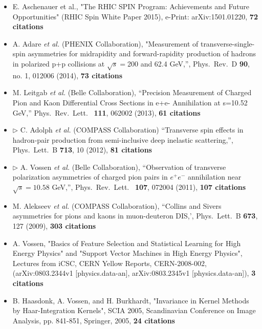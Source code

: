 \documentclass[11pt,letterpaper,sans]{moderncv} %
\begin{document}
\begin{itemize}
\item E. Aschenauer et al., "The RHIC SPIN Program: Achievements and Future Opportunities" (RHIC Spin White Paper 2015), e-Print: arXiv:1501.01220, \textbf{72 citations}
\item A. Adare \textit{ et al.}  (PHENIX Collaboration), "Measurement of transverse-single-spin asymmetries for midrapidity and forward-rapidity production of hadrons in polarized p+p collisions at $\sqrt{s}=$200 and 62.4 GeV,'', Phys.\ Rev.\ D \textbf{ 90}, no. 1, 012006 (2014), \textbf{73 citations}
    \item M. Leitgab \textit{  et al.} (Belle Collaboration), ``Precision Measurement of Charged Pion and Kaon Differential Cross Sections in e+e- Annihilation at s=10.52  GeV,'' Phys.\ Rev.\ Lett.\  \textbf{ 111}, 062002 (2013), \textbf{61 citations}
    \item $\rhd$ C. Adolph  \textit{  et al.} (COMPASS Collaboration)  ``Transverse spin effects in hadron-pair production from semi-inclusive deep inelastic scattering,'', Phys.\ Lett.\ B \textbf{ 713}, 10 (2012), \textbf{81 citations}
    \item $\rhd$ A. Vossen \textit{   et al.} (Belle Collaboration), ``Observation of transverse polarization asymmetries of charged pion pairs in $e^+e^-$ annihilation near $\sqrt{s}=10.58$ GeV,'', Phys.\ Rev.\ Lett.\  \textbf{ 107}, 072004 (2011), \textbf{107 citations}
    \item M. Alekseev \textit{  et al.} (COMPASS Collaboration), ``Collins and Sivers asymmetries for pions and kaons in muon-deuteron DIS,', Phys.\ Lett.\ B \textbf{ 673}, 127 (2009), \textbf{303 citations}
\item A. Vossen, "Basics of Feature Selection and Statistical Learning for High Energy Physics" and "Support Vector Machines in High Energy Physics", Lectures from iCSC, CERN Yellow Reports, CERN-2008-002, (arXiv:0803.2344v1 [physics.data-an], arXiv:0803.2345v1 [physics.data-an]), \textbf{3 citations}
\item B. Haasdonk, A. Vossen, and H. Burkhardt, "Invariance in Kernel Methods by Haar-Integration Kernels", SCIA 2005, Scandinavian Conference on Image Analysis, pp. 841-851, Springer, 2005, \textbf{24 citations}
\end{itemize}
\end{document}
